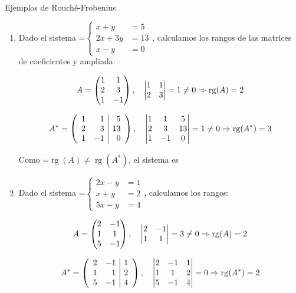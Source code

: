 \documentclass[11pt,a4paper]{article}
\newcommand{\fmm}[1]{\setbox0=\hbox{$#1$}\ifdim\wd0>\linewidth\fmdisp{#1}\else\mbox{\box0}\fi}
\newcommand{\fmdisp}[1]{\[\setbox2=\hbox{$\displaystyle #1$}\ifdim\wd2>\linewidth\resizebox{\linewidth}{!}{\box2}\else\box2\fi\]}
\newcommand{\fmbadge}[2]{\tcbox[on line,colback=#1,colframe=#1,arc=2mm,boxsep=0pt,left=4pt,right=4pt,top=1.5pt,bottom=1.5pt]{\color{white}\footnotesize\bfseries #2}}
\begin{document}
\begin{fmex}{Ejemplos de Rouché-Frobenius}
\begin{enumerate}[label=\textbf{\arabic*.},leftmargin=*]
\item Dado el sistema \fmm{\left\{\begin{aligned}x+y&=5\\ 2x+3y&=13\\ x-y&=0\end{aligned}\right.}, calculamos los rangos de las matrices de coeficientes y ampliada:

\fmdisp{A=\begin{pmatrix}1 & 1\\ 2 & 3\\ 1 & -1\end{pmatrix},\quad\begin{vmatrix}1 & 1\\ 2 & 3\end{vmatrix}=1\neq0\Rightarrow\operatorname{rg}(A)=2}

\fmdisp{A^*=\left(\begin{array}{rr|r}1 & 1 & 5\\ 2 & 3 & 13\\ 1 & -1 & 0\end{array}\right),\quad\begin{vmatrix}1 & 1 & 5\\ 2 & 3 & 13\\ 1 & -1 & 0\end{vmatrix}=1\neq0\Rightarrow\operatorname{rg}(A^*)=3}

Como \fmm{\operatorname{rg}(A)\neq\operatorname{rg}(A^*)}, el sistema es \fmbadge{fmsi}{SI}
\item Dado el sistema \fmm{\left\{\begin{aligned}2x-y&=1\\ x+y&=2\\ 5x-y&=4\end{aligned}\right.}, calculamos los rangos:

\fmdisp{A=\begin{pmatrix}2 & -1\\ 1 & 1\\ 5 & -1\end{pmatrix},\quad\begin{vmatrix}2 & -1\\ 1 & 1\end{vmatrix}=3\neq0\Rightarrow\operatorname{rg}(A)=2}

\fmdisp{A^*=\left(\begin{array}{rr|r}2 & -1 & 1\\ 1 & 1 & 2\\ 5 & -1 & 4\end{array}\right),\quad\begin{vmatrix}2 & -1 & 1\\ 1 & 1 & 2\\ 5 & -1 & 4\end{vmatrix}=0\Rightarrow\operatorname{rg}(A^*)=2}


\end{enumerate}
\end{fmex}
\end{document}
